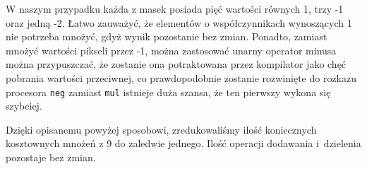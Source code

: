 \documentclass{classrep}
\begin{document}
W naszym przypadku każda z masek posiada pięć wartości równych 1, trzy -1 oraz jedną -2. Łatwo zauważyć, że elementów o współczynnikach wynoszących 1 nie potrzeba mnożyć, gdyż wynik pozostanie bez zmian. Ponadto, zamiast mnożyć wartości pikseli przez -1, można zastosować unarny operator minusa \ppauza można przypuszczać, że zostanie ona potraktowana przez kompilator jako chęć pobrania wartości przeciwnej, co prawdopodobnie zostanie rozwinięte do rozkazu procesora \verb|neg| zamiast \verb|mul| \ppauza istnieje duża szansa, że ten pierwszy wykona się szybciej.

Dzięki opisanemu powyżej sposobowi, zredukowaliśmy ilość koniecznych kosztownych mnożeń z 9 do zaledwie jednego. Ilość operacji dodawania i~dzielenia pozostaje bez zmian.

\begin{thebibliography}{99}
\end{thebibliography}
\end{document}

